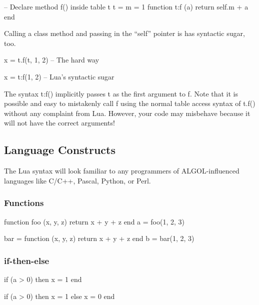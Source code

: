 \documentclass[11pt]{article}
\newcommand{\keyword}[1]{\mbox{\ttfamily#1}}
\begin{document}
\begin{LuaCode}
-- Declare method f() inside table t
t = {
	m = 1
}
function t:f (a)
	return self.m + a
end
\end{LuaCode}

Calling a class method and passing in the ``self'' pointer is has syntactic
sugar, too.

\begin{LuaCode}
x = t.f(t, 1, 2) -- The hard way
\end{LuaCode}

\begin{LuaCode}
x = t:f(1, 2)    -- Lua’s syntactic sugar
\end{LuaCode}

The syntax \keyword{t:f()} implicitly passes \keyword{t} as the first argument to \keyword{f}.  Note that it
is possible and easy to mistakenly call \keyword{f} using the normal table access syntax
of \keyword{t.f()} without any complaint from Lua.   However, your code may misbehave
because it will not have the correct arguments!

\subsection{Language Constructs}

The Lua syntax will look familiar to any programmers of ALGOL-influenced
languages like C/C++, Pascal, Python, or Perl.   

\subsubsection{Functions}

\begin{LuaCode}
function foo (x, y, z)
	return x + y + z
end
a = foo(1, 2, 3)
\end{LuaCode}

\begin{LuaCode}
bar = function (x, y, z)
	return x + y + z
end
b = bar(1, 2, 3)
\end{LuaCode}

\subsubsection{if-then-else}

\begin{LuaCode}
if (a > 0) then
	x = 1
end
\end{LuaCode}

\begin{LuaCode}
if (a > 0) then
	x = 1
else
	x = 0
end
\end{LuaCode}
\end{document}
